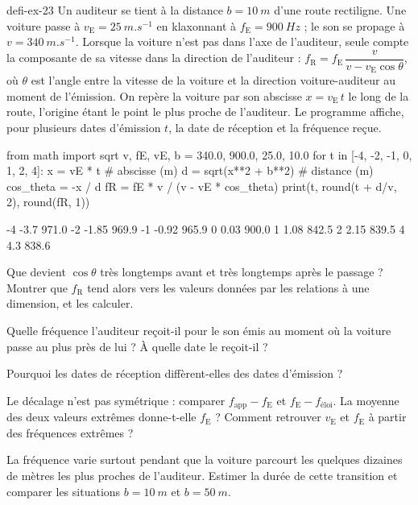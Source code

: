 \begin{blocEdition}{defi-ex-23}
Un auditeur se tient à la distance $b=\qty{10}{m}$ d'une route rectiligne. Une voiture passe à $v_\mathrm{E}=\qty{25}{m.s^{-1}}$ en
klaxonnant à $f_\mathrm{E}=\qty{900}{Hz}$ ; le son se propage à $v=\qty{340}{m.s^{-1}}$. Lorsque la voiture n'est pas dans l'axe de
l'auditeur, seule compte la composante de sa vitesse dans la direction de l'auditeur : $f_\mathrm{R}=f_\mathrm{E}\,\dfrac{v}{v-v_\mathrm{E}\cos\theta}$,
où $\theta$ est l'angle entre la vitesse de la voiture et la direction voiture-auditeur au moment de l'émission. On
repère la voiture par son abscisse $x=v_\mathrm{E}\,t$ le long de la route, l'origine étant le point le plus proche de
l'auditeur. Le programme affiche, pour plusieurs dates d'émission $t$, la date de réception et la fréquence reçue.
\begin{codecote}[0.66]
\begin{pythoncol}
from math import sqrt
v, fE, vE, b = 340.0, 900.0, 25.0, 10.0
for t in [-4, -2, -1, 0, 1, 2, 4]:
    x = vE * t               # abscisse (m)
    d = sqrt(x**2 + b**2)    # distance (m)
    cos_theta = -x / d
    fR = fE * v / (v - vE * cos_theta)
    print(t, round(t + d/v, 2), round(fR, 1))
\end{pythoncol}
\cote
\begin{consolecol}
-4 -3.7 971.0
-2 -1.85 969.9
-1 -0.92 965.9
0 0.03 900.0
1 1.08 842.5
2 2.15 839.5
4 4.3 838.6
\end{consolecol}
\end{codecote}
\par\smallskip
\begin{questions}
\item Que devient $\cos\theta$ très longtemps avant et très longtemps après le passage ? Montrer que $f_\mathrm{R}$ tend alors
vers les valeurs données par les relations à une dimension, et les calculer.
\item Quelle fréquence l'auditeur reçoit-il pour le son émis au moment où la voiture passe au plus près de lui ? À quelle
date le reçoit-il ?
\item Pourquoi les dates de réception diffèrent-elles des dates d'émission ?
\item Le décalage n'est pas symétrique : comparer $f_\mathrm{app}-f_\mathrm{E}$ et $f_\mathrm{E}-f_\text{éloi}$. La moyenne des deux valeurs
extrêmes donne-t-elle $f_\mathrm{E}$ ? Comment retrouver $v_\mathrm{E}$ et $f_\mathrm{E}$ à partir des fréquences extrêmes ?
\item La fréquence varie surtout pendant que la voiture parcourt les quelques dizaines de mètres les plus proches de
l'auditeur. Estimer la durée de cette transition et comparer les situations $b=\qty{10}{m}$ et $b=\qty{50}{m}$.
\end{questions}
\end{blocEdition}

